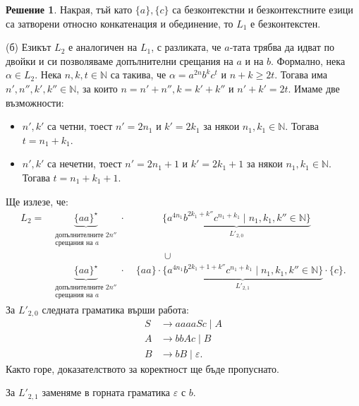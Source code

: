 \documentclass[12pt]{article}
\newcommand{\N}{\mathbb{N}}
\theoremstyle{definition}
\newtheorem*{solution}{Решение}
\begin{document}
\begin{solution}
  Накрая, тъй като $\{ a \}, \{ c \}$ са безконтекстни и безконтекстните езици са затворени относно конкатенация и обединение, то $L_1$ е безконтекстен.

  (б) Езикът $L_2$ е аналогичен на $L_1$, с разликата, че $a$-тата трябва да идват по двойки и си позволяваме допълнителни срещания на $a$ и на $b$.
  Формално, нека $\alpha \in L_2$.
  Нека $n, k, t \in \N$ са такива, че $\alpha = a^{2n} b^k c^t$ и $n + k \geq 2t$.
  Тогава има $n', n'', k', k'' \in \N$, за които $n = n' + n'', k = k' + k''$ и $n' + k' = 2t$.
  Имаме две възможности:
  \begin{itemize}
    \item[1 сл.] $n', k'$ са четни, тоест $n' = 2n_1$ и $k' = 2k_1$ за някои $n_1, k_1 \in \N$.
                 Тогава $t = n_1 + k_1$.
    \item[2 сл.] $n', k'$ са нечетни, тоест $n' = 2n_1 + 1$ и $k' = 2k_1 + 1$ за някои $n_1, k_1 \in \N$.
                 Тогава $t = n_1 + k_1 + 1$.
  \end{itemize}
  Ще излезе, че:
  \begin{align*}
  L_2 = & \underbrace{\{ aa \}^\star}_{\substack{\text{допълнителните } 2n'' \\ \text{срещания на } a}} \cdot \phantom{aaaaaaa} \underbrace{\{ a^{4n_1} b^{2k_1 + k''} c^{n_1 + k_1} \mid n_1, k_1, k'' \in \N \}}_{L'_{2, 0}} \\ 
          & \phantom{aaaaaaaaaaaaaaaaaaaaa} \cup                                                                                                                                                                                      \\         
          & \underbrace{\{ aa \}^\star}_{\substack{\text{допълнителните } 2n'' \\ \text{срещания на } a}} \cdot \phantom{aa} \{ aa \} \cdot \underbrace{\{ a^{4n_1} b^{2k_1 + 1 + k''} c^{n_1 + k_1} \mid n_1, k_1, k'' \in \N \}}_{L'_{2, 1}} \cdot \{ c \}.
  \end{align*}
  За $L'_{2, 0}$ следната граматика върши работа:
  \begin{align*}
    S & \longrightarrow aaaa S c \mid A \\
    A & \longrightarrow bb A c \mid B   \\
    B & \longrightarrow bB \mid \varepsilon.
  \end{align*}
  Както горе, доказателството за коректност ще бъде пропуснато.

  За $L'_{2, 1}$ заменяме в горната граматика $\varepsilon$ с $b$.
\end{solution}
\end{document}

